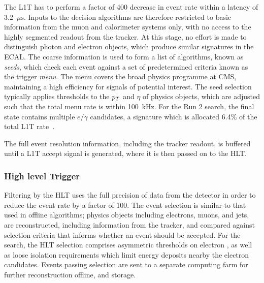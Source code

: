 The L1T has to perform a factor of 400 decrease in event rate within a latency of 3.2~$\mu\mathrm{s}$. Inputs to the decision algorithms are therefore restricted to basic information from the muon and calorimeter systems only, with no access to the highly segmented readout from the tracker. At this stage, no effort is made to distinguish photon and electron objects, which produce similar signatures in the ECAL. The coarse information is used to form a list of algorithms, known as \textit{seeds}, which check each event against a set of predetermined criteria known as the trigger \textit{menu}. The menu covers the broad physics programme at CMS, maintaining a high efficiency for signals of potential interest. The seed selection typically applies thresholds to the $p_T$ and $\eta$ of physics objects, which are adjusted such that the total menu rate is within 100~kHz. For the Run 2 \Hee search, the final state contains multiple $e$/$\gamma$ candidates, a signature which is allocated 6.4\% of the total L1T rate~\cite{CMS_L1T}.

The full event resolution information, including the tracker readout, is buffered until a L1T accept signal is generated, where it is then passed on to the HLT.


\subsubsection{High level Trigger}

Filtering by the HLT uses the full precision of data from the detector in order to reduce the event rate by a factor of 100. The event selection is similar to that used in offline algorithms; physics objects including electrons, muons, and jets, are reconstructed, including information from the tracker, and compared against selection criteria that informs whether an event should be accepted. For the \Hee search, the HLT selection comprises asymmetric thresholds on electron \pt, as well as loose isolation requirements which limit energy deposits nearby the electron candidates. Events passing selection are sent to a separate computing farm for further reconstruction offline, and storage.



